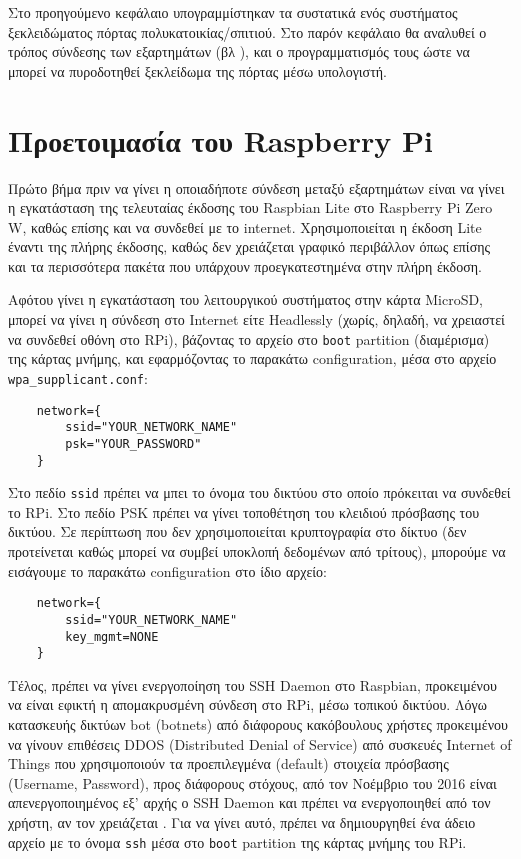 Στο προηγούμενο κεφάλαιο υπογραμμίστηκαν τα συστατικά ενός συστήματος ξεκλειδώματος πόρτας πολυκατοικίας/σπιτιού. Στο παρόν κεφάλαιο θα αναλυθεί ο τρόπος σύνδεσης των εξαρτημάτων (βλ ), και ο προγραμματισμός τους ώστε να μπορεί να πυροδοτηθεί ξεκλείδωμα της πόρτας μέσω υπολογιστή.

\section{Προετοιμασία του Raspberry Pi}
	Πρώτο βήμα πριν να γίνει η οποιαδήποτε σύνδεση μεταξύ εξαρτημάτων είναι να γίνει η εγκατάσταση της τελευταίας έκδοσης του Raspbian Lite στο Raspberry Pi Zero W, καθώς επίσης και να συνδεθεί με το internet. Χρησιμοποιείται η έκδοση Lite έναντι της πλήρης έκδοσης, καθώς δεν χρειάζεται γραφικό περιβάλλον όπως επίσης και τα περισσότερα πακέτα που υπάρχουν προεγκατεστημένα στην πλήρη έκδοση.

	Αφότου γίνει η εγκατάσταση του λειτουργικού συστήματος στην κάρτα MicroSD, μπορεί να γίνει η σύνδεση στο Internet είτε Headlessly (χωρίς, δηλαδή, να χρειαστεί να συνδεθεί οθόνη στο RPi), βάζοντας το αρχείο στο \verb|boot| partition (διαμέρισμα) της κάρτας μνήμης, και εφαρμόζοντας το παρακάτω configuration, μέσα στο αρχείο \verb|wpa_supplicant.conf|\textsuperscript{\cite{rpi_wifi_headless}}:

	\begin{lstlisting}
	network={
		ssid="YOUR_NETWORK_NAME"
		psk="YOUR_PASSWORD"
	}\end{lstlisting} 

	Στο πεδίο \verb|ssid| πρέπει να μπει το όνομα του δικτύου στο οποίο πρόκειται να συνδεθεί το RPi. Στο πεδίο PSK πρέπει να γίνει τοποθέτηση του κλειδιού πρόσβασης του δικτύου. Σε περίπτωση που δεν χρησιμοποιείται κρυπτογραφία στο δίκτυο (δεν προτείνεται καθώς μπορεί να συμβεί υποκλοπή δεδομένων από τρίτους), μπορούμε να εισάγουμε το παρακάτω configuration στο ίδιο αρχείο:

	\begin{lstlisting}
	network={
		ssid="YOUR_NETWORK_NAME"
		key_mgmt=NONE
	}\end{lstlisting} 

	Τέλος, πρέπει να γίνει ενεργοποίηση του SSH Daemon στο Raspbian, προκειμένου να είναι εφικτή η απομακρυσμένη σύνδεση στο RPi, μέσω τοπικού δικτύου. Λόγω κατασκευής δικτύων bot (botnets) από διάφορους κακόβουλους χρήστες προκειμένου να γίνουν επιθέσεις DDOS (Distributed Denial of Service) από συσκευές Internet of Things που χρησιμοποιούν τα προεπιλεγμένα (default) στοιχεία πρόσβασης (Username, Password), προς διάφορους στόχους, από τον Νοέμβριο του 2016 είναι απενεργοποιημένος εξ' αρχής ο SSH Daemon και πρέπει να ενεργοποιηθεί από τον χρήστη, αν τον χρειάζεται . Για να γίνει αυτό, πρέπει να δημιουργηθεί ένα άδειο αρχείο με το όνομα \verb|ssh| μέσα στο \verb|boot| partition της κάρτας μνήμης του RPi.

